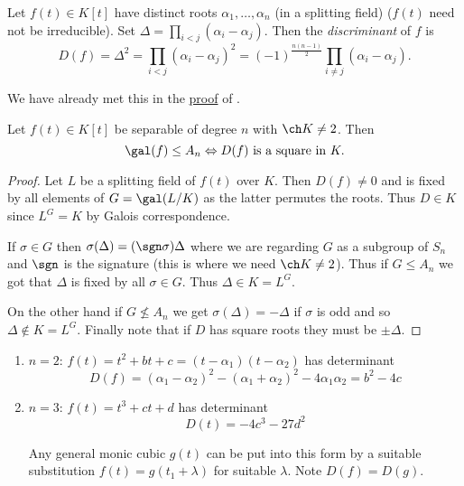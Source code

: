 \documentclass[a4paper]{article}
\begin{document}
\begin{definition}[Discriminant]
  Let \(f(t) \in K[t]\) have distinct roots \(\alpha_1, \dots, \alpha_n\) (in a splitting field) (\(f(t)\) need not be irreducible). Set \(\Delta = \prod_{i < j}(\alpha_i - \alpha_j)\). Then the \emph{discriminant} of \(f\) is
  \[
    D(f) = \Delta^2 = \prod_{i < j}(\alpha_i - \alpha_j)^2 = (-1)^{\frac{n(n-1)}{2}} \prod_{i \neq j}(\alpha_i - \alpha_j).
  \]
\end{definition}

\begin{remark}
  We have already met this in the \hyperref[proof:vandermonde]{proof} of .
\end{remark}

\begin{lemma}
  Let \(f(t) \in K[t]\) be separable of degree \(n\) with \(\ch K \neq 2\). Then
  \[
    \gal(f) \leq A_n \Leftrightarrow D(f) \text{ is a square in } K.
  \]
\end{lemma}

\begin{proof}
  Let \(L\) be a splitting field of \(f(t)\) over \(K\). Then \(D(f) \neq 0\) and is fixed by all elements of \(G = \gal(L/K)\) as the latter permutes the roots. Thus \(D \in K\) since \(L^G = K\) by Galois correspondence.

  If \(\sigma \in G\) then \(\sigma(\Delta) = (\sgn \sigma) \Delta\) where we are regarding \(G\) as a subgroup of \(S_n\) and \(\sgn\) is the signature (this is where we need \(\ch K \neq 2\)). Thus if \(G \leq A_n\) we got that \(\Delta\) is fixed by all \(\sigma \in G\). Thus \(\Delta \in K = L^G\).

  On the other hand if \(G \nleq A_n\) we get \(\sigma(\Delta) = -\Delta\) if \(\sigma\) is odd and so \(\Delta \notin K = L^G\). Finally note that if \(D\) has square roots they must be \(\pm \Delta\).
\end{proof}

\begin{eg}\leavevmode
  \begin{enumerate}
  \item \(n = 2\): \(f(t) =t^2 + bt + c = (t - \alpha_1)(t - \alpha_2)\) has determinant
    \[
      D(f) = (\alpha_1 - \alpha_2)^2 - (\alpha_1 + \alpha_2)^2 - 4\alpha_1\alpha_2 = b^2 - 4c
    \]
  \item \(n = 3\): \(f(t) = t^3 + ct + d\) has determinant
    \[
      D(t) = -4c^3 - 27d^2
   \]
   \begin{remark}
     Any general monic cubic \(g(t)\) can be put into this form by a suitable substitution \(f(t) = g(t_1 + \lambda)\) for suitable \(\lambda\). Note \(D(f) = D(g)\).
   \end{remark}
 \end{enumerate}
\end{eg}
\end{document}
